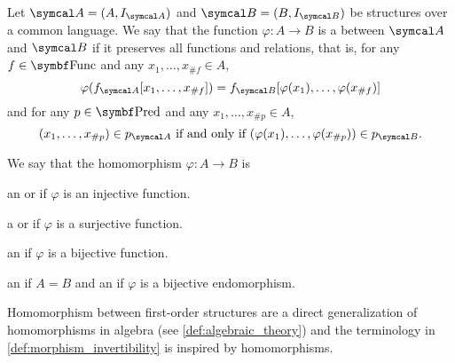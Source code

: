 \begin{definition}\label{def:first_order_homomorphism}\cite[definition 23.8]{OpenLogic20201202}
  Let \( \Cal{A} = (A, I_{\Cal{A}}) \) and \( \Cal{B} = (B, I_{\Cal{B}}) \) be structures over a common language. We say that the function \( \varphi: A \to B \) is a  between \( \Cal{A} \) and \( \Cal{B} \) if it preserves all functions and relations, that is, for any \( f \in \Cat{Func} \) and any \( x_1, \ldots, x_{\#f} \in A \),
  \begin{equation*}
    \varphi(f_{\Cal{A}}[x_1, \ldots, x_{\#f}]) = f_{\Cal{B}}[\varphi(x_1), \ldots, \varphi(x_{\#f})]
  \end{equation*}
  and for any \( p \in \Cat{Pred} \) and any \( x_1, \ldots, x_{\#p} \in A \),
  \begin{equation*}
    (x_1, \ldots, x_{\#p}) \in p_{\Cal{A}} \text{ if and only if } (\varphi(x_1), \ldots, \varphi(x_{\#p})) \in p_{\Cal{B}}.
  \end{equation*}

  We say that the homomorphism \( \varphi: A \to B \) is
  \begin{defenum}
     an  or  if \( \varphi \) is an injective function.

     a  or  if \( \varphi \) is a surjective function.

     an  if \( \varphi \) is a bijective function.

     an  if \( A = B \) and an  if \( \varphi \) is a bijective endomorphism.
  \end{defenum}

  Homomorphism between first-order structures are a direct generalization of homomorphisms in algebra (see \cref{def:algebraic_theory}) and the terminology in \cref{def:morphism_invertibility} is inspired by homomorphisms.
\end{definition}

